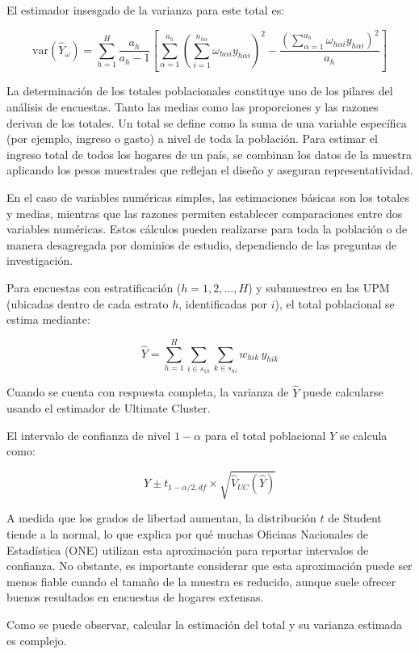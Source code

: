 \documentclass[
  12pt,
]{book}
\begin{document}
El estimador insesgado de la varianza para este total es:

\[
\text{var}\left(\hat{Y}_{\omega}\right) = \sum_{h=1}^{H} \frac{a_h}{a_h - 1} \left[ \sum_{\alpha=1}^{a_h} \left( \sum_{i=1}^{n_{h\alpha}} \omega_{h\alpha i} y_{h\alpha i} \right)^2 - \frac{\left( \sum_{\alpha=1}^{a_h} \omega_{h\alpha i} y_{h\alpha i} \right)^2}{a_h} \right]
\]

La determinación de los totales poblacionales constituye uno de los pilares del análisis de encuestas. Tanto las medias como las proporciones y las razones derivan de los totales. Un total se define como la suma de una variable específica (por ejemplo, ingreso o gasto) a nivel de toda la población. Para estimar el ingreso total de todos los hogares de un país, se combinan los datos de la muestra aplicando los pesos muestrales que reflejan el diseño y aseguran representatividad.

En el caso de variables numéricas simples, las estimaciones básicas son los totales y medias, mientras que las razones permiten establecer comparaciones entre dos variables numéricas. Estos cálculos pueden realizarse para toda la población o de manera desagregada por dominios de estudio, dependiendo de las preguntas de investigación.

Para encuestas con estratificación (\(h=1,2,...,H\)) y submuestreo en las UPM (ubicadas dentro de cada estrato \(h\), identificadas por \(i\)), el total poblacional se estima mediante:

\[
\hat{Y} = \sum_{h=1}^{H} \sum_{i \in s_{1h}} \sum_{k \in s_{hi}} w_{hik} \, y_{hik}
\]

Cuando se cuenta con respuesta completa, la varianza de \(\hat{Y}\) puede calcularse usando el estimador de Ultimate Cluster.

El intervalo de confianza de nivel \(1-\alpha\) para el total poblacional \(Y\) se calcula como:

\[
\hat{Y} \pm t_{1-\alpha/2, df} \times \sqrt{\hat{V}_{UC}(\hat{Y})}
\]

A medida que los grados de libertad aumentan, la distribución \(t\) de Student tiende a la normal, lo que explica por qué muchas Oficinas Nacionales de Estadística (ONE) utilizan esta aproximación para reportar intervalos de confianza. No obstante, es importante considerar que esta aproximación puede ser menos fiable cuando el tamaño de la muestra es reducido, aunque suele ofrecer buenos resultados en encuestas de hogares extensas.

Como se puede observar, calcular la estimación del total y su varianza estimada es complejo.
\end{document}
